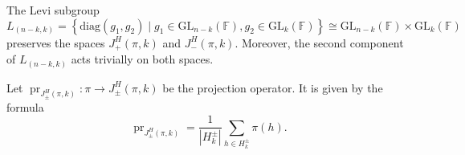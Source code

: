 \documentclass[12pt, reqno]{amsart}
\theoremstyle{definition}
\newcommand{\sizeof}[1]{\left|#1\right|}
\newcommand{\diag}{\mathrm{diag}}
\newcommand{\GL}{\mathrm{GL}}
\newcommand{\finiteField}{\mathbb{F}}
\newcommand{\pHJacquetModule}[2]{J^H_{+}\left(#1, #2\right)}
\newcommand{\pnHJacquetModule}[2]{J^H_{\pm}\left(#1, #2\right)}
\newcommand{\nHJacquetModule}[2]{J^H_{-}\left(#1, #2\right)}
\newcommand{\ProjectionOperator}{\operatorname{pr}}
\begin{document}
	The Levi subgroup
	\begin{displaymath}
	L_{\left(n-k, k\right)} = \left\{\diag\left(g_1, g_2\right) \mid g_1 \in \GL_{n-k}\left(\finiteField\right), g_2 \in \GL_{k}\left(\finiteField\right) \right\} \cong \GL_{n-k}\left(\finiteField\right) \times \GL_k\left(\finiteField\right)
	\end{displaymath}
	preserves the spaces $\pHJacquetModule{\pi}{k}$ and $\nHJacquetModule{\pi}{k}$. Moreover, the second component of $L_{\left(n-k,k\right)}$ acts trivially on both spaces.
	
	Let $\ProjectionOperator_{\pnHJacquetModule{\pi}{k}} \colon \pi \to \pnHJacquetModule{\pi}{k}$ be the projection operator. It is given by the formula
	\begin{displaymath}
	\ProjectionOperator_{\pnHJacquetModule{\pi}{k}} = \frac{1}{\sizeof{H_k^{\pm}}} \sum_{h \in H_k^{\pm}} \pi\left(h\right).
	\end{displaymath}
	
\end{document}

